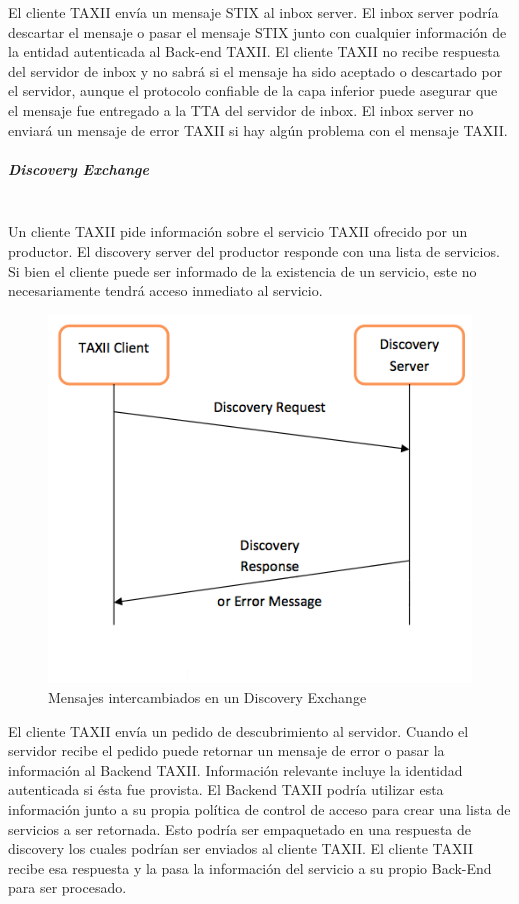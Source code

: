 El cliente TAXII envía un mensaje STIX al inbox server. El inbox server podría 
descartar el mensaje o pasar el mensaje STIX junto con cualquier información de 
la entidad autenticada al Back-end TAXII. El cliente TAXII no recibe respuesta 
del servidor de inbox y no sabrá si el mensaje ha sido aceptado o descartado por 
el servidor, aunque el protocolo confiable de la capa inferior puede asegurar 
que el mensaje fue entregado a la TTA del servidor de inbox. El inbox server no 
enviará un mensaje de error TAXII si hay algún problema con el mensaje TAXII.

\subparagraph{Discovery Exchange}\ \\

Un cliente TAXII pide información sobre el servicio TAXII ofrecido por un 
productor. El discovery server del productor responde con una lista de 
servicios. Si bien el cliente puede ser informado de la existencia de un 
servicio, este no necesariamente tendrá acceso inmediato al servicio.\\

\begin{figure}[ht!]
  \centering
    \includegraphics[width=150mm]{./images/DiscoveryExchange.png}
     \caption{Mensajes intercambiados en un Discovery Exchange \protect\cite{b1}}
\end{figure}

El cliente TAXII envía un pedido de descubrimiento al servidor. Cuando el 
servidor recibe el pedido puede retornar un mensaje de error o pasar la 
información al Backend TAXII. Información relevante incluye la identidad 
autenticada si ésta fue provista. El Backend TAXII podría utilizar esta 
información junto a su propia política de control de acceso  para crear una 
lista de servicios a ser retornada. Esto podría ser empaquetado en una 
respuesta de discovery los cuales podrían ser enviados al cliente TAXII. El 
cliente TAXII recibe esa respuesta y la pasa la información del servicio a su 
propio Back-End para ser procesado.

